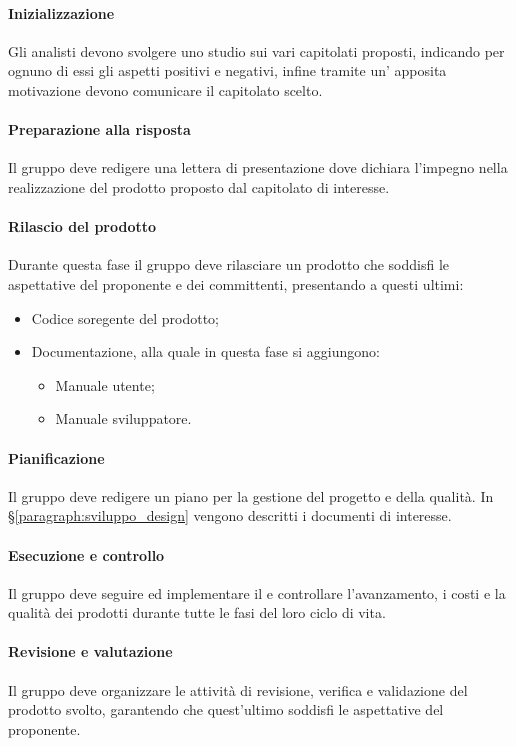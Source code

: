 \paragraph{Inizializzazione}
Gli analisti devono svolgere uno studio sui vari capitolati proposti, indicando per ognuno di essi gli aspetti positivi e negativi, infine tramite un' apposita motivazione devono comunicare il capitolato scelto.
\paragraph{Preparazione alla risposta}
Il gruppo \groupName{} deve redigere una lettera di presentazione dove dichiara l'impegno nella realizzazione del prodotto proposto dal capitolato di interesse.
\paragraph{Rilascio del prodotto}
Durante questa fase il gruppo \groupName{} deve rilasciare un prodotto che soddisfi le aspettative del proponente e dei committenti, presentando a questi ultimi:
\begin{itemize}
    \vspace{1 cm}
    \item Codice soregente del prodotto;
    \item Documentazione, alla quale in questa fase si aggiungono:
    \begin{itemize}
        \item Manuale utente;
        \item Manuale sviluppatore.       
    \end{itemize}   
\end{itemize}
\paragraph{Pianificazione}
Il gruppo \groupName{} deve redigere un piano per la gestione del progetto e della qualità. 
In §\ref{paragraph:sviluppo_design} vengono descritti i documenti di interesse.
\paragraph{Esecuzione e controllo}
Il gruppo deve seguire ed implementare il \docNamePdPLow{} e controllare l'avanzamento, i costi e la qualità dei prodotti durante tutte le fasi del loro ciclo di vita.
\paragraph{Revisione e valutazione} 
Il gruppo \groupName{} deve organizzare le attività di revisione, verifica e validazione del prodotto svolto, garantendo che quest'ultimo soddisfi le aspettative del proponente.   
